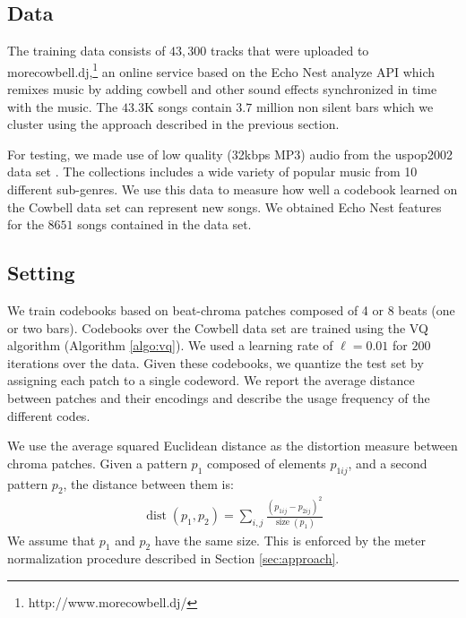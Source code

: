 \documentclass{article}
\DeclareMathOperator*{\dist}{dist}
\DeclareMathOperator*{\size}{size}
\newcommand{\ie}{i.e.~}
\begin{document}
\subsection{Data}
\label{sec:traindata}
\label{sec:testdata}
The training data consists of $43,300$ tracks that were uploaded to
morecowbell.dj,\footnote{http://www.morecowbell.dj/} an online service
based on the Echo Nest analyze API which remixes music by
adding cowbell and other sound effects synchronized in time with the
music.  The $43.3$K songs contain $\mathbf{3.7}$ million non silent
bars which we cluster using the approach described in the previous
section.

For testing, we made use of low quality (32kbps MP3) audio 
from the uspop2002 data set \cite{uspop2002}.  The collections
includes a wide variety of popular music from 10 different sub-genres.
We use this data to measure how well a codebook learned on
the Cowbell data set can represent new songs.  
We obtained Echo Nest features for the $8651$ songs contained in the data set.

\subsection{Setting}\label{ssec:setting}
We train codebooks based on beat-chroma patches composed of 4 or 8
beats (one or two bars).
Codebooks over the Cowbell
data set are trained using the VQ algorithm (Algorithm \ref{algo:vq}). We used a
learning rate of $\ell=0.01$ for $200$ iterations over the data.
%
Given these codebooks, we quantize the test set by assigning each
patch to a single codeword.  We report the average
distance between patches and their encodings and describe the usage
frequency of the different codes. %

We use the average squared Euclidean distance as the distortion
measure between chroma patches.  Given a pattern $p_1$
composed of elements $p_{1ij}$, and a second pattern $p_2$, the
distance between them is:
\begin{eqnarray}
  \dist(p_1,p_2) = \sum_{i,j} \frac{(p_{1ij} - p_{2ij})^2}{\size(p_1)}
  \label{eq:dist}
\end{eqnarray}
We assume that $p_1$ and $p_2$ have the same size.  This is enforced by the
meter normalization procedure described in Section \ref{sec:approach}.
\end{document}
